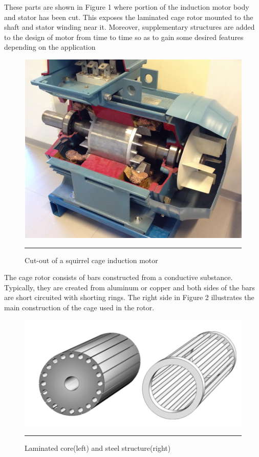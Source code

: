 These parts are shown in Figure 1 where portion of the induction motor body and stator has been cut. This exposes the laminated cage rotor mounted to the shaft and stator winding near it. Moreover, supplementary structures are added to the design of motor from time to time so as to gain some desired features depending on the application
\begin{figure}[htbp]
	\centering
		\includegraphics[width = 4.5in]{./Figures/MS/26.png}
		\rule{35em}{0.5pt}
	\caption{Cut-out of a squirrel cage induction motor}
	\label{fig:Cut-out of a squirrel cage induction motor}
\end{figure}

The cage rotor consists of bars constructed from a conductive substance. Typically, they are created from aluminum or copper and both sides of the bars are short circuited with shorting rings. The right side in Figure 2 illustrates the main construction of the cage used in the rotor.
\begin{figure}[htbp]
	\centering
		\includegraphics[width = 4.5in]{./Figures/MS/27.png}
		\rule{35em}{0.5pt}
	\caption{Laminated core(left) and steel structure(right)}
	\label{fig:Laminated core(left) and steel structure(right)}
\end{figure}

